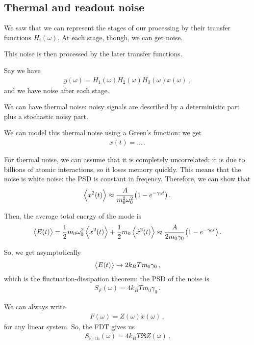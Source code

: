 \documentclass[main.tex]{subfiles}
\begin{document}
\subsection{Thermal and readout noise}

We saw that we can represent the stages of our processing by their transfer functions \(H_{i}(\omega )\). At each stage, though, we can get noise.

This noise is then processed by the later transfer functions. 

Say we have 
%
\begin{align}
y(\omega ) = H_1 (\omega ) H_2 (\omega ) H_3 (\omega ) x(\omega )
\,,
\end{align}
%
and we have noise after each stage. 

We can have thermal noise: noisy signals are described by a deterministic part plus a stochastic noisy part.

We can model this thermal noise using a Green's function: we get 
%
\begin{align}
x(t) = \dots
\,.
\end{align}

For thermal noise, we can assume that it is completely uncorrelated: it is due to billions of atomic interactions, so it loses memory quickly.
This means that the noise is white noise: the PSD is constant in freqency. Therefore, we can show that 
%
\begin{align}
\expval{x^2(t)} \approx \frac{A}{m_0^2 \omega_0^2} \qty(1 - e^{- \gamma_0 t})
\,.
\end{align}

Then, the average total energy of the mode is 
%
\begin{align}
\expval{E(t)} 
= \frac{1}{2} m_0 \omega_0^2 \expval{x^2(t)} + \frac{1}{2} m_0 \expval{\dot{x}^2(t)}
\approx \frac{A}{2 m_0 \gamma_0 } \qty(1 - e^{-\gamma_0 t})
\,.
\end{align}

So, we get asymptotically 
%
\begin{align}
\expval{E(t)} \to 2 k_B T m_0 \gamma_0 
\,,
\end{align}
%
which is the fluctuation-dissipation theorem: the PSD of the noise is 
%
\begin{align}
S_F(\omega ) = 4 k_B T m_0 \gamma_0 
\,.
\end{align}

We can always write 
%
\begin{align}
F(\omega ) = Z(\omega ) \dot{x}(\omega )
\,,
\end{align}
%
for any linear system.
So, the FDT gives us 
%
\begin{align}
S _{\text{F, th}} (\omega ) = 4 k_B T \Re{Z(\omega )}
\,.
\end{align}
\end{document}
